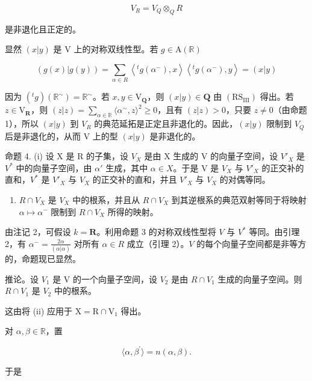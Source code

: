 \[
V _ {R} = V _ {Q} \otimes_ {Q} R
\]

是非退化且正定的。

显然 \((x|y)\) 是 V 上的对称双线性型。若 \(g\in \mathrm{A}(\mathbb{R})\)

\[
(g (x) | g (y)) = \sum_ {\alpha \in R} \left\langle {} ^ {t} g \left(\alpha^ {-}\right), x \right\rangle \left\langle {} ^ {t} g \left(\alpha^ {-}\right), y \right\rangle = (x | y)
\]

因为 \((^t g)(\mathbb{R}^\sim) = \mathbb{R}^\sim\)。若 \(x, y \in \mathrm{V}_{\mathbf{Q}}\)，则 \((x|y) \in \mathbf{Q}\) 由 \((\mathrm{RS}_{\mathrm{III}})\) 得出。若 \(z \in \mathrm{V}_{\mathbf{R}}\)，则 \((z|z) = \sum_{\alpha \in \mathbb{R}} \langle \alpha^\sim, z \rangle^2 \geqslant 0\)，且有 \((z|z) > 0\)，只要 \(z \neq 0\)（由命题 1），所以 \((x|y)\) 到 \(V_{R}\) 的典范延拓是正定且非退化的。因此，\((x|y)\) 限制到 \(V_{Q}\) 后是非退化的，从而 V 上的型 \((x|y)\) 是非退化的。

命题 4. (i) 设 X 是 R 的子集，设 \(V_{X}\) 是由 X 生成的 V 的向量子空间，设 \(V'_{X}\) 是 \(V^{*}\) 中的向量子空间，由 \(\alpha'\) 生成，其中 \(\alpha \in X\)。于是 V 是 \(V_{X}\) 与 \(V'_{X}\) 的正交补的直和，\(V^{*}\) 是 \(V'_{X}\) 与 \(V_{X}\) 的正交补的直和，并且 \(V'_{X}\) 与 \(V_{X}\) 的对偶等同。

\begin{enumerate}
\def\labelenumi{(\roman{enumi})}
\setcounter{enumi}{1}
\tightlist
\item
  \(R \cap V_{X}\) 是 \(V_{X}\) 中的根系，并且从 \(R \cap V_{X}\) 到其逆根系的典范双射等同于将映射 \(\alpha \mapsto \alpha^{-}\) 限制到 \(R \cap V_{X}\) 所得的映射。
\end{enumerate}

由注记 2，可假设 \(k = \mathbf{R}\)。利用命题 3 的对称双线性型将 \(V\) 与 \(V^*\) 等同。由引理 2，有 \(\alpha^{-} = \frac{2\alpha}{(\alpha|\alpha)}\) 对所有 \(\alpha \in R\) 成立（引理 2）。\(V\) 的每个向量子空间都是非等方的，命题现已显然。

推论。设 \(V_{1}\) 是 V 的一个向量子空间，设 \(V_{2}\) 是由 \(R \cap V_{1}\) 生成的向量子空间。则 \(R \cap V_{1}\) 是 \(V_{2}\) 中的根系。

这由将 (ii) 应用于 \(\mathrm{X} = \mathrm{R} \cap \mathrm{V}_1\) 得出。

对 \(\alpha, \beta \in \mathbb{R}\)，置

\[
\langle \alpha , \beta^ {\prime} \rangle = n (\alpha , \beta).\tag{1}
\]

于是

